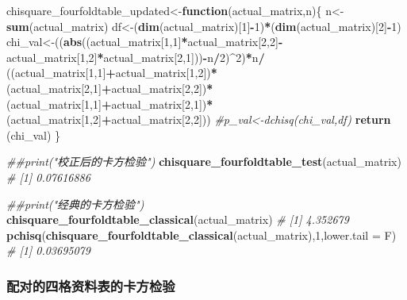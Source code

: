 \documentclass[
]{article}
\newenvironment{Shaded}{\begin{snugshade}}{\end{snugshade}}
\newcommand{\CommentTok}[1]{\textcolor[rgb]{0.56,0.35,0.01}{\textit{#1}}}
\newcommand{\ControlFlowTok}[1]{\textcolor[rgb]{0.13,0.29,0.53}{\textbf{#1}}}
\newcommand{\DataTypeTok}[1]{\textcolor[rgb]{0.13,0.29,0.53}{#1}}
\newcommand{\DecValTok}[1]{\textcolor[rgb]{0.00,0.00,0.81}{#1}}
\newcommand{\KeywordTok}[1]{\textcolor[rgb]{0.13,0.29,0.53}{\textbf{#1}}}
\newcommand{\NormalTok}[1]{#1}
\newcommand{\OperatorTok}[1]{\textcolor[rgb]{0.81,0.36,0.00}{\textbf{#1}}}
\newcommand{\StringTok}[1]{\textcolor[rgb]{0.31,0.60,0.02}{#1}}
\begin{document}
\begin{Shaded}
\begin{Highlighting}[]
\NormalTok{chisquare_fourfoldtable_updated<-}\ControlFlowTok{function}\NormalTok{(actual_matrix,n)\{}
\NormalTok{     n<-}\KeywordTok{sum}\NormalTok{(actual_matrix)}
\NormalTok{     df<-(}\KeywordTok{dim}\NormalTok{(actual_matrix)[}\DecValTok{1}\NormalTok{]}\OperatorTok{-}\DecValTok{1}\NormalTok{)}\OperatorTok{*}\NormalTok{(}\KeywordTok{dim}\NormalTok{(actual_matrix)[}\DecValTok{2}\NormalTok{]}\OperatorTok{-}\DecValTok{1}\NormalTok{)}
\NormalTok{     chi_val<-((}\KeywordTok{abs}\NormalTok{((actual_matrix[}\DecValTok{1}\NormalTok{,}\DecValTok{1}\NormalTok{]}\OperatorTok{*}\NormalTok{actual_matrix[}\DecValTok{2}\NormalTok{,}\DecValTok{2}\NormalTok{]}\OperatorTok{-}\NormalTok{actual_matrix[}\DecValTok{1}\NormalTok{,}\DecValTok{2}\NormalTok{]}\OperatorTok{*}\NormalTok{actual_matrix[}\DecValTok{2}\NormalTok{,}\DecValTok{1}\NormalTok{]))}\OperatorTok{-}\NormalTok{n}\OperatorTok{/}\DecValTok{2}\NormalTok{)}\OperatorTok{^}\DecValTok{2}\NormalTok{)}\OperatorTok{*}\NormalTok{n}\OperatorTok{/}
\StringTok{     }\NormalTok{((actual_matrix[}\DecValTok{1}\NormalTok{,}\DecValTok{1}\NormalTok{]}\OperatorTok{+}\NormalTok{actual_matrix[}\DecValTok{1}\NormalTok{,}\DecValTok{2}\NormalTok{])}\OperatorTok{*}\NormalTok{(actual_matrix[}\DecValTok{2}\NormalTok{,}\DecValTok{1}\NormalTok{]}\OperatorTok{+}\NormalTok{actual_matrix[}\DecValTok{2}\NormalTok{,}\DecValTok{2}\NormalTok{])}\OperatorTok{*}\NormalTok{(actual_matrix[}\DecValTok{1}\NormalTok{,}\DecValTok{1}\NormalTok{]}\OperatorTok{+}\NormalTok{actual_matrix[}\DecValTok{2}\NormalTok{,}\DecValTok{1}\NormalTok{])}\OperatorTok{*}\NormalTok{(actual_matrix[}\DecValTok{1}\NormalTok{,}\DecValTok{2}\NormalTok{]}\OperatorTok{+}\NormalTok{actual_matrix[}\DecValTok{2}\NormalTok{,}\DecValTok{2}\NormalTok{]))}
     \CommentTok{#p_val<-dchisq(chi_val,df)}
     \KeywordTok{return}\NormalTok{ (chi_val)}
\NormalTok{\}}

\CommentTok{##print("校正后的卡方检验")}
\KeywordTok{chisquare_fourfoldtable_test}\NormalTok{(actual_matrix)}
\CommentTok{# [1] 0.07616886}

\CommentTok{##print("经典的卡方检验")}
\KeywordTok{chisquare_fourfoldtable_classical}\NormalTok{(actual_matrix)}
\CommentTok{# [1] 4.352679}
\KeywordTok{pchisq}\NormalTok{(}\KeywordTok{chisquare_fourfoldtable_classical}\NormalTok{(actual_matrix),}\DecValTok{1}\NormalTok{,}\DataTypeTok{lower.tail =}\NormalTok{ F)}
\CommentTok{# [1] 0.03695079}
\end{Highlighting}
\end{Shaded}

\hypertarget{ux914dux5bf9ux7684ux56dbux683cux8d44ux6599ux8868ux7684ux5361ux65b9ux68c0ux9a8c}{%
\subsubsection{配对的四格资料表的卡方检验}\label{ux914dux5bf9ux7684ux56dbux683cux8d44ux6599ux8868ux7684ux5361ux65b9ux68c0ux9a8c}}
\end{document}
